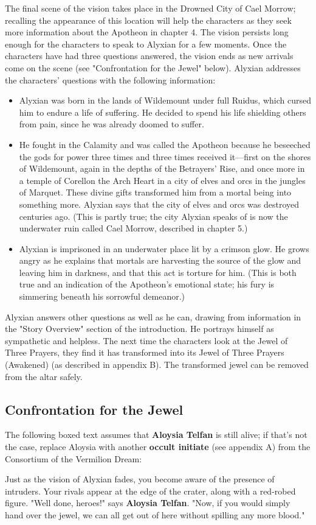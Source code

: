 \documentclass[10pt,a4,twoside,twocolumn,openany,nodeprecatedcode]{dndbook}
\begin{document}
The final scene of the vision takes place in the Drowned City of Cael Morrow; recalling the appearance of this location will help the characters as they seek more information about the Apotheon in chapter 4.
The vision persists long enough for the characters to speak to Alyxian for a few moments. Once the characters have had three questions answered, the vision ends as new arrivals come on the scene (see "Confrontation for the Jewel" below). Alyxian addresses the characters' questions with the following information:
\begin{itemize}

\item Alyxian was born in the lands of Wildemount under full Ruidus, which cursed him to endure a life of suffering. He decided to spend his life shielding others from pain, since he was already doomed to suffer.
\item He fought in the Calamity and was called the Apotheon because he beseeched the gods for power three times and three times received it—first on the shores of Wildemount, again in the depths of the Betrayers' Rise, and once more in a temple of Corellon the Arch Heart in a city of elves and orcs in the jungles of Marquet. These divine gifts transformed him from a mortal being into something more. Alyxian says that the city of elves and orcs was destroyed centuries ago. (This is partly true; the city Alyxian speaks of is now the underwater ruin called Cael Morrow, described in chapter 5.)
\item Alyxian is imprisoned in an underwater place lit by a crimson glow. He grows angry as he explains that mortals are harvesting the source of the glow and leaving him in darkness, and that this act is torture for him. (This is both true and an indication of the Apotheon's emotional state; his fury is simmering beneath his sorrowful demeanor.)
\end{itemize}


Alyxian answers other questions as well as he can, drawing from information in the "Story Overview" section of the introduction. He portrays himself as sympathetic and helpless.
The next time the characters look at the Jewel of Three Prayers, they find it has transformed into its Jewel of Three Prayers (Awakened) (as described in appendix B). The transformed jewel can be removed from the altar safely.
\subsection{Confrontation for the Jewel}
The following boxed text assumes that \textbf{Aloysia Telfan} is still alive; if that's not the case, replace Aloysia with another \textbf{occult initiate} (see appendix A) from the Consortium of the Vermilion Dream:
\begin{DndReadAloud}{}
Just as the vision of Alyxian fades, you become aware of the presence of intruders. Your rivals appear at the edge of the crater, along with a red-robed figure. "Well done, heroes!" says \textbf{Aloysia Telfan}. "Now, if you would simply hand over the jewel, we can all get out of here without spilling any more blood."
\end{DndReadAloud}
\end{document}
